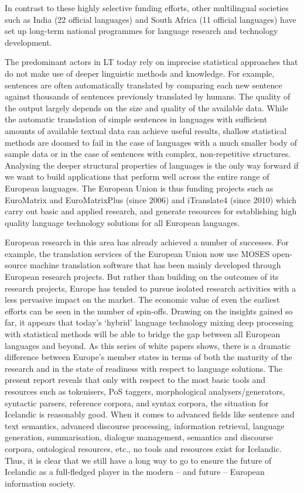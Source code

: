 \begin{multicols}{2}
In contrast to these highly selective funding efforts, other multilingual societies such as India (22 official languages) and South Africa (11 official languages) have set up long-term national programmes for language research and technology development. 

The predominant actors in LT today rely on imprecise statistical approaches that do not make use of deeper linguistic methods and knowledge. For example, sentences are often automatically translated by comparing each new sentence against thousands of sentences previously translated by humans. The quality of the output largely depends on the size and quality of the available data. While the automatic translation of simple sentences in languages with sufficient amounts of available textual data can achieve useful results, shallow statistical methods are doomed to fail in the case of languages with a much smaller body of sample data or in the case of sentences with complex, non-repetitive structures. Analysing the deeper structural properties of languages is the only way forward if we want to build applications that perform well across the entire range of European languages.
The European Union is thus funding projects such as EuroMatrix and EuroMatrixPlus (since 2006) and iTranslate4 (since 2010) which carry out basic and applied research, and generate resources for establishing high quality language technology solutions for all European languages. 

European research in this area has already achieved a number of successes. For example, the translation services of the European Union now use MOSES open-source machine translation software that has been mainly developed through European research projects. But rather than building on the outcomes of its research projects, Europe has tended to pursue isolated research activities with a less pervasive impact on the market. The economic value of even the earliest efforts can be seen in the number of spin-offs. 
Drawing on the insights gained so far, it appears that today’s ‘hybrid’ language technology mixing deep processing with statistical methods will be able to bridge the gap between all European languages and beyond. As this series of white papers shows, there is a dramatic difference between Europe’s member states in terms of both the maturity of the research and in the state of readiness with respect to language solutions. The present report reveals that only with respect to the most basic tools and resources such as tokenisers, PoS taggers, morphological analysers/generators, syntactic parsers, reference corpora, and syntax corpora, the situation for Icelandic is reasonably good. When it comes to advanced fields like sentence and text semantics, advanced discourse processing, information retrieval, language generation, summarisation, dialogue management, semantics and discourse corpora, ontological resources, etc., no tools and resources exist for Icelandic. Thus, it is clear that we still have a long way to go to ensure the future of Icelandic as a full-fledged player in the modern -- and future -- European information society. 


\end{multicols}
